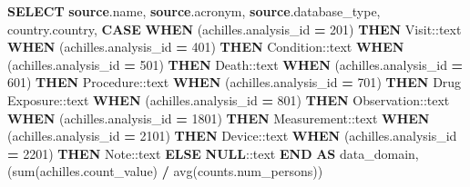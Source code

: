 \documentclass[
]{book}
\newenvironment{Shaded}{\begin{snugshade}}{\end{snugshade}}
\newcommand{\CharTok}[1]{\textcolor[rgb]{0.31,0.60,0.02}{#1}}
\newcommand{\ControlFlowTok}[1]{\textcolor[rgb]{0.13,0.29,0.53}{\textbf{#1}}}
\newcommand{\DecValTok}[1]{\textcolor[rgb]{0.00,0.00,0.81}{#1}}
\newcommand{\FunctionTok}[1]{\textcolor[rgb]{0.00,0.00,0.00}{#1}}
\newcommand{\KeywordTok}[1]{\textcolor[rgb]{0.13,0.29,0.53}{\textbf{#1}}}
\newcommand{\NormalTok}[1]{#1}
\newcommand{\OperatorTok}[1]{\textcolor[rgb]{0.81,0.36,0.00}{\textbf{#1}}}
\newcommand{\StringTok}[1]{\textcolor[rgb]{0.31,0.60,0.02}{#1}}
\begin{document}
\begin{Shaded}
\begin{Highlighting}[]
\KeywordTok{SELECT} \KeywordTok{source}\NormalTok{.name,}
   \KeywordTok{source}\NormalTok{.acronym,}
   \KeywordTok{source}\NormalTok{.database\_type,}
\NormalTok{   country.country,}
       \ControlFlowTok{CASE}
           \ControlFlowTok{WHEN}\NormalTok{ (achilles.analysis\_id }\OperatorTok{=} \DecValTok{201}\NormalTok{)}
             \ControlFlowTok{THEN} \StringTok{\textquotesingle{}Visit\textquotesingle{}}\NormalTok{:}\CharTok{:text}
           \ControlFlowTok{WHEN}\NormalTok{ (achilles.analysis\_id }\OperatorTok{=} \DecValTok{401}\NormalTok{)}
             \ControlFlowTok{THEN} \StringTok{\textquotesingle{}Condition\textquotesingle{}}\NormalTok{:}\CharTok{:text}
           \ControlFlowTok{WHEN}\NormalTok{ (achilles.analysis\_id }\OperatorTok{=} \DecValTok{501}\NormalTok{)}
             \ControlFlowTok{THEN} \StringTok{\textquotesingle{}Death\textquotesingle{}}\NormalTok{:}\CharTok{:text}
           \ControlFlowTok{WHEN}\NormalTok{ (achilles.analysis\_id }\OperatorTok{=} \DecValTok{601}\NormalTok{)}
             \ControlFlowTok{THEN} \StringTok{\textquotesingle{}Procedure\textquotesingle{}}\NormalTok{:}\CharTok{:text}
           \ControlFlowTok{WHEN}\NormalTok{ (achilles.analysis\_id }\OperatorTok{=} \DecValTok{701}\NormalTok{)}
             \ControlFlowTok{THEN} \StringTok{\textquotesingle{}Drug Exposure\textquotesingle{}}\NormalTok{:}\CharTok{:text}
           \ControlFlowTok{WHEN}\NormalTok{ (achilles.analysis\_id }\OperatorTok{=} \DecValTok{801}\NormalTok{)}
             \ControlFlowTok{THEN} \StringTok{\textquotesingle{}Observation\textquotesingle{}}\NormalTok{:}\CharTok{:text}
           \ControlFlowTok{WHEN}\NormalTok{ (achilles.analysis\_id }\OperatorTok{=} \DecValTok{1801}\NormalTok{)}
             \ControlFlowTok{THEN} \StringTok{\textquotesingle{}Measurement\textquotesingle{}}\NormalTok{:}\CharTok{:text}
           \ControlFlowTok{WHEN}\NormalTok{ (achilles.analysis\_id }\OperatorTok{=} \DecValTok{2101}\NormalTok{)}
             \ControlFlowTok{THEN} \StringTok{\textquotesingle{}Device\textquotesingle{}}\NormalTok{:}\CharTok{:text}
           \ControlFlowTok{WHEN}\NormalTok{ (achilles.analysis\_id }\OperatorTok{=} \DecValTok{2201}\NormalTok{)}
             \ControlFlowTok{THEN} \StringTok{\textquotesingle{}Note\textquotesingle{}}\NormalTok{:}\CharTok{:text}
           \ControlFlowTok{ELSE} \KeywordTok{NULL}\NormalTok{:}\CharTok{:text}
       \ControlFlowTok{END} \KeywordTok{AS}\NormalTok{ data\_domain,}
\NormalTok{   (}\FunctionTok{sum}\NormalTok{(achilles.count\_value) }\OperatorTok{/} \FunctionTok{avg}\NormalTok{(counts.num\_persons))}

\end{Highlighting}
\end{Shaded}
\end{document}
